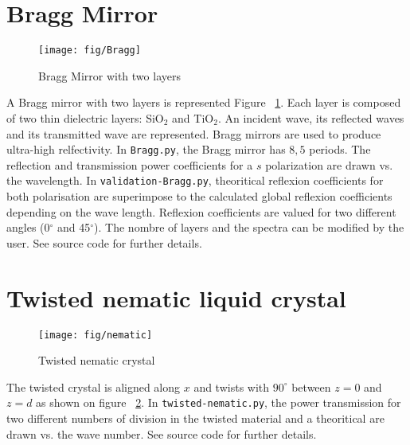 \section{Bragg Mirror}
\begin{figure}[!h]
\texttt{[image: fig/Bragg]}
\caption{\label{fig:Bragg}Bragg Mirror with two layers}
\end{figure}
A Bragg mirror with two layers is represented Figure ~\ref{fig:Bragg}. Each layer is composed of two thin dielectric layers: SiO$_2$ and TiO$_2$. An incident wave, its reflected waves and its transmitted wave are represented. Bragg mirrors are used to produce ultra-high relfectivity. In \verb/Bragg.py/, the Bragg mirror has $8,5$ periods. The reflection and transmission power coefficients for a $s$ polarization are drawn vs. the wavelength. In \verb/validation-Bragg.py/, theoritical reflexion coefficients for both polarisation are superimpose to the calculated global reflexion coefficients depending on the wave length. Reflexion coefficients are valued for two different angles (0$^\circ$ and 45$^\circ$). The nombre of layers and the spectra can be modified by the user. See source code for further details.

\section{Twisted nematic liquid crystal}
\begin{figure}[!h]
\begin{center}
\texttt{[image: fig/nematic]}
\caption{\label{fig:nematic} Twisted nematic crystal}
\end{center}
\end{figure}
The twisted crystal is aligned along $x$ and twists with  $90^\circ$ between $z=0$ and $z=d$ as shown on figure ~\ref{fig:nematic}. In \verb/twisted-nematic.py/, the power transmission for two different numbers of division in the twisted material and a theoritical are drawn vs. the wave number. See source code for further details. 


